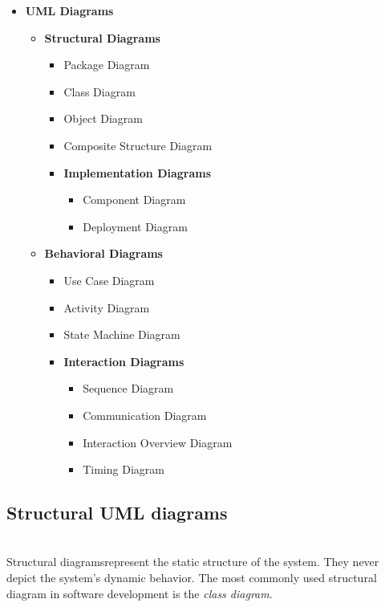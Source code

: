 \vspace{0.3cm}
\begin{itemize}
\item \textbf{UML Diagrams}
\begin{itemize}
\item \textbf{Structural Diagrams}
\begin{itemize}
\item Package Diagram
\item Class Diagram
\item Object Diagram
\item Composite Structure Diagram
\end{itemize}
\begin{itemize}
\item \textbf{Implementation Diagrams}
\begin{itemize}
\item Component Diagram
\item Deployment Diagram
\end{itemize}
\end{itemize}
\end{itemize}
\begin{itemize}
\item \textbf{Behavioral Diagrams}
\begin{itemize}
\item Use Case Diagram
\item Activity Diagram
\item State Machine Diagram
\end{itemize}
\begin{itemize}
\item \textbf{Interaction Diagrams}
\begin{itemize}
\item Sequence Diagram
\item Communication Diagram
\item Interaction Overview Diagram
\item Timing Diagram
\end{itemize}
\end{itemize}
\end{itemize}
\end{itemize}

\subsection{Structural UML diagrams}\label{structural-uml-diagrams}
\\
Structural diagramsrepresent the static structure of the system. They never depict the system's dynamic behavior. The most commonly used structural diagram in software development is the \emph{class diagram}.

